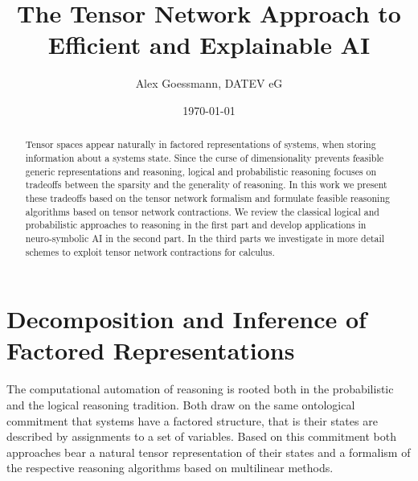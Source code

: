 \documentclass[aps,onecolumn,nofootinbib,pra]{article}
\begin{document}
\title{The Tensor Network Approach to Efficient and Explainable AI}
\author{Alex Goessmann, DATEV eG}

\maketitle
\date{\today}

\begin{abstract}
	Tensor spaces appear naturally in factored representations of systems, when storing information about a systems state.
	Since the curse of dimensionality prevents feasible generic representations and reasoning, logical and probabilistic reasoning focuses on tradeoffs between the sparsity and the generality of reasoning.
	In this work we present these tradeoffs based on the tensor network formalism and formulate feasible reasoning algorithms based on tensor network contractions.
	We review the classical logical and probabilistic approaches to reasoning in the first part and develop applications in neuro-symbolic AI in the second part.
	In the third parts we investigate in more detail schemes to exploit tensor network contractions for calculus.
\end{abstract}	

\tableofcontents




\part{Decomposition and Inference of Factored Representations}

The computational automation of reasoning is rooted both in the probabilistic and the logical reasoning tradition.
Both draw on the same ontological commitment that systems have a factored structure, that is their states are described by assignments to a set of variables.
Based on this commitment both approaches bear a natural tensor representation of their states and a formalism of the respective reasoning algorithms based on multilinear methods.








\end{document}
